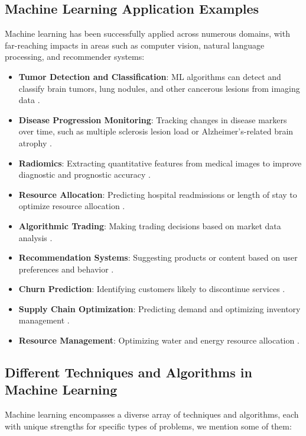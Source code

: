 \subsection{Machine Learning Application Examples}
\label{sec:ml_applications}
Machine learning has been successfully applied across numerous domains, with far-reaching impacts in areas such as computer vision, natural language processing, and recommender systems:

\begin{itemize}
  \item \textbf{Tumor Detection and Classification}: ML algorithms can detect and classify brain tumors, lung nodules, and other cancerous lesions from imaging data \cite{wang2019machine}.
  \item \textbf{Disease Progression Monitoring}: Tracking changes in disease markers over time, such as multiple sclerosis lesion load or Alzheimer's-related brain atrophy \cite{mortaheb2019machine}.
  \item \textbf{Radiomics}: Extracting quantitative features from medical images to improve diagnostic and prognostic accuracy \cite{lambin2012radiomics}.
  \item \textbf{Resource Allocation}: Predicting hospital readmissions or length of stay to optimize resource allocation \cite{futoma2015comparison}.
  \item \textbf{Algorithmic Trading}: Making trading decisions based on market data analysis \cite{treleaven2013algorithmic}.
  \item \textbf{Recommendation Systems}: Suggesting products or content based on user preferences and behavior \cite{ricci2011introduction}.
  \item \textbf{Churn Prediction}: Identifying customers likely to discontinue services \cite{verbeke2012building}.
  \item \textbf{Supply Chain Optimization}: Predicting demand and optimizing inventory management \cite{carbonneau2008application}.
  \item \textbf{Resource Management}: Optimizing water and energy resource allocation \cite{wu2014real}.
\end{itemize}

\subsection{Different Techniques and Algorithms in Machine Learning}
\label{sec:ml_techniques}
Machine learning encompasses a diverse array of techniques and algorithms, each with unique strengths for specific types of problems, we mention some of them:

